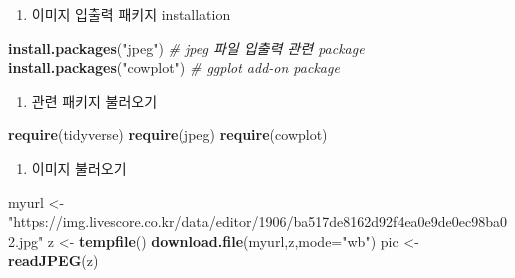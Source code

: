 \documentclass[
  11pt,
]{krantz}
\newenvironment{Shaded}{\begin{snugshade}}{\end{snugshade}}
\newcommand{\CommentTok}[1]{\textcolor[rgb]{0.37,0.37,0.37}{\textit{#1}}}
\newcommand{\DataTypeTok}[1]{\textcolor[rgb]{0.27,0.27,0.27}{#1}}
\newcommand{\KeywordTok}[1]{\textcolor[rgb]{0.27,0.27,0.27}{\textbf{#1}}}
\newcommand{\NormalTok}[1]{#1}
\newcommand{\StringTok}[1]{\textcolor[rgb]{0.5,0.5,0.5}{#1}}
\providecommand{\tightlist}{%
  \setlength{\itemsep}{0pt}\setlength{\parskip}{0pt}}
\begin{document}
\normalsize

\begin{enumerate}
\def\labelenumi{\arabic{enumi}.}
\tightlist
\item
  이미지 입출력 패키지 installation
\end{enumerate}

\footnotesize

\begin{Shaded}
\begin{Highlighting}[]
\KeywordTok{install.packages}\NormalTok{(}\StringTok{"jpeg"}\NormalTok{) }\CommentTok{# jpeg 파일 입출력 관련 package}
\KeywordTok{install.packages}\NormalTok{(}\StringTok{"cowplot"}\NormalTok{) }\CommentTok{# ggplot add-on package}
\end{Highlighting}
\end{Shaded}

\normalsize

\begin{enumerate}
\def\labelenumi{\arabic{enumi}.}
\setcounter{enumi}{1}
\tightlist
\item
  관련 패키지 불러오기
\end{enumerate}

\footnotesize

\begin{Shaded}
\begin{Highlighting}[]
\KeywordTok{require}\NormalTok{(tidyverse)}
\KeywordTok{require}\NormalTok{(jpeg)}
\KeywordTok{require}\NormalTok{(cowplot)}
\end{Highlighting}
\end{Shaded}

\normalsize

\begin{enumerate}
\def\labelenumi{\arabic{enumi}.}
\setcounter{enumi}{2}
\tightlist
\item
  이미지 불러오기
\end{enumerate}

\footnotesize

\begin{Shaded}
\begin{Highlighting}[]
\NormalTok{myurl <-}\StringTok{ "https://img.livescore.co.kr/data/editor/1906/ba517de8162d92f4ea0e9de0ec98ba02.jpg"}
\NormalTok{z <-}\StringTok{ }\KeywordTok{tempfile}\NormalTok{()}
\KeywordTok{download.file}\NormalTok{(myurl,z,}\DataTypeTok{mode=}\StringTok{"wb"}\NormalTok{)}
\NormalTok{pic <-}\StringTok{ }\KeywordTok{readJPEG}\NormalTok{(z)}
\end{Highlighting}
\end{Shaded}
\end{document}
